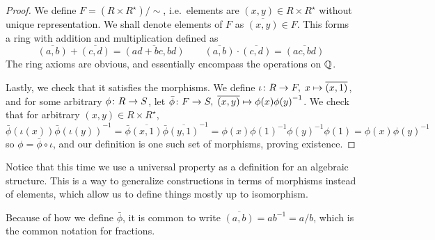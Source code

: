 \begin{proof}
    We define \(F = (R \times R^\star)/{\sim}\),
    i.e.\ elements are \((x,y) \in R \times R^\star\)
    without unique representation.
    We shall denote elements of \(F\) as \(\overline{(x,y)} \in F\).
    This forms a ring with addition and multiplication defined as
    \begin{equation*}
        \overline{(a,b)} + \overline{(c,d)} = \overline{(ad+bc,bd)} \qquad
        \overline{(a,b)} \cdot \overline{(c,d)} = \overline{(ac,bd)}
    \end{equation*}
    The ring axioms are obvious,
    and essentially encompass the operations on \(\mathbb{Q}\).

    Lastly, we check that it satisfies the morphisms.
    We define \(\iota\colon R\to F,\;x\mapsto\overline{(x,1)}\),
    and for some arbitrary \(\phi\colon R\to S\),
    let \(\bar{\phi}\colon F\to S,\;\overline{(x,y)}\mapsto\phi(x){\phi(y)}^{-1}\).
    We check that for arbitrary \((x,y) \in R \times R^\star\),
    \begin{equation*}
        \bar{\phi}(\iota(x)){\bar{\phi}(\iota(y))}^{-1}
        = \bar{\phi}\overline{(x,1)}{\bar{\phi}\overline{(y,1)}}^{-1}
        = \phi(x){\phi(1)}^{-1}{\phi(y)}^{-1}\phi(1)
        = \phi(x){\phi(y)}^{-1}
    \end{equation*}
    so \(\phi = \bar{\phi}\circ\iota\),
    and our definition is one such set of morphisms, proving existence.
\end{proof}
\begin{remark}
    Notice that this time we use a universal property
    as a definition for an algebraic structure.
    This is a way to generalize constructions
    in terms of morphisms instead of elements,
    which allow us to define things mostly up to isomorphism.
\end{remark}
\begin{remark}
    Because of how we define \(\bar{\phi}\),
    it is common to write \(\overline{(a,b)} = ab^{-1} = a/b\),
    which is the common notation for fractions.
\end{remark}


